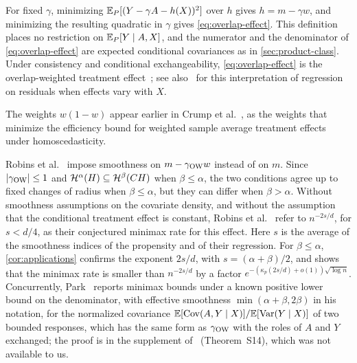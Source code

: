 \begin{example}\label{ex:overlap-effect}
For fixed $\gamma$, minimizing $\mathbb E_P[(Y-\gamma A-h(X))^2]$ over $h$
gives $h=m-\gamma w$, and minimizing the resulting quadratic in
$\gamma$ gives \eqref{eq:overlap-effect}. This definition places no
restriction on $\mathbb E_P[Y\mid A,X]$, and the numerator and the denominator
of \eqref{eq:overlap-effect} are expected conditional covariances as in
\cref{sec:product-class}. Under consistency and conditional
exchangeability, \eqref{eq:overlap-effect} is the overlap-weighted
treatment effect~\cite{limorganzaslavsky}; see
also~\cite[Remark~9.3.3]{causalmlbook} for this interpretation of
regression on residuals when effects vary with $X$.
\end{example}

The weights $w(1-w)$ appear earlier in Crump et al.~\cite[Section~5.4,
Corollary~5.2]{crump2006}, as the weights that minimize the efficiency
bound for weighted sample average treatment effects under
homoscedasticity.

Robins et al.~\cite[Example~1c]{hoif2008} impose smoothness on
$m-\gamma_{\rm OW}w$ instead of on $m$. Since $|\gamma_{\rm OW}|\le1$
and $\mathcal H^\alpha(H)\subseteq\mathcal H^\beta(CH)$ when $\beta\le\alpha$, the two
conditions agree up to fixed changes of radius when $\beta\le\alpha$,
but they can differ when $\beta>\alpha$. Without smoothness assumptions
on the covariate density, and without the assumption that the
conditional treatment effect is constant, Robins et
al.~\cite[Remark~4.2]{hoif2008} refer to $n^{-2s/d}$, for $s<d/4$, as
their conjectured minimax rate for this effect. Here $s$ is the average
of the smoothness indices of the propensity and of their regression.
For $\beta\le\alpha$, \cref{cor:applications} confirms the exponent
$2s/d$, with $s=(\alpha+\beta)/2$, and shows that the minimax rate is
smaller than $n^{-2s/d}$ by a factor
$e^{-(\kappa_p(2s/d)+o(1))\sqrt{\log n}}$. Concurrently,
Park~\cite[Section~2]{park} reports minimax bounds under a known
positive lower bound on the denominator, with effective smoothness
$\min(\alpha+\beta,2\beta)$ in his notation, for the normalized
covariance $\mathbb E[\operatorname{Cov}(A,Y\mid X)]/\mathbb E[\operatorname{Var}(Y\mid X)]$ of two bounded
responses, which has the same form as $\gamma_{\rm OW}$ with the roles
of $A$ and $Y$ exchanged; the proof is in the supplement
of~\cite{park} (Theorem~S14), which was not available to us.

